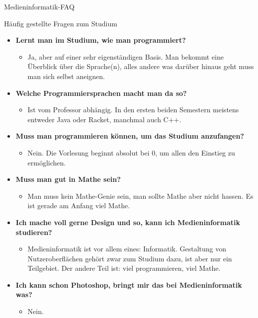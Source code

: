 \begin{Huge}
	Medieninformatik-FAQ
\end{Huge}
\begin{block}{Häufig gestellte Fragen zum Studium}
\begin{large}
\begin{itemize}
		\item \textbf{Lernt man im Studium, wie man programmiert?}
		\begin{itemize}
			\item Ja, aber auf einer sehr eigenständigen Basis. Man bekommt eine Überblick über die Sprache(n), alles andere was darüber hinaus geht muss man sich selbst aneignen.
		\end{itemize}
	
		\item \textbf{Welche Programmiersprachen macht man da so?}
		\begin{itemize}
			\item Ist vom Professor abhängig. In den ersten beiden Semestern meistens entweder Java oder Racket, manchmal auch C++.
		\end{itemize}
	
		\item \textbf{Muss man programmieren können, um das Studium anzufangen?}
		\begin{itemize}
			\item Nein. Die Vorlesung beginnt absolut bei 0, um allen den Einstieg zu ermöglichen.
		\end{itemize}
	
		\item \textbf{Muss man gut in Mathe sein?}
		\begin{itemize}
			\item Man muss kein Mathe-Genie sein, man sollte Mathe aber nicht hassen. Es ist gerade am Anfang viel Mathe.
		\end{itemize}

	\item \textbf{Ich mache voll gerne Design und so, kann ich Medieninformatik studieren?}
	\begin{itemize}
		\item Medieninformatik ist vor allem eines: Informatik. Gestaltung von Nutzeroberflächen gehört zwar zum Studium dazu, ist aber nur ein Teilgebiet. Der andere Teil ist: viel programmieren, viel Mathe.
	\end{itemize}

\item \textbf{Ich kann schon Photoshop, bringt mir das bei Medieninformatik was?}
\begin{itemize}
	\item Nein.
\end{itemize}


\end{itemize}
\end{large}
\end{block}
